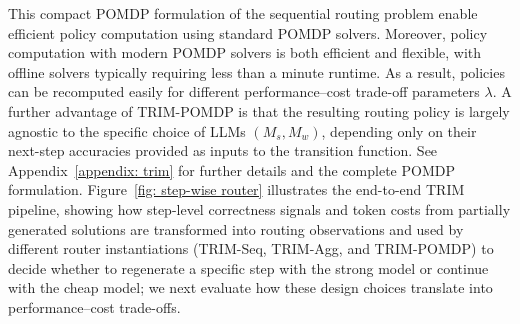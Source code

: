 \documentclass{article}
\theoremstyle{plain}
\theoremstyle{definition}
\theoremstyle{remark}
\begin{document}
This compact POMDP formulation of the sequential routing problem enable efficient policy computation using standard POMDP solvers. Moreover, policy computation with modern POMDP solvers is both efficient and flexible, with offline solvers typically requiring less than a minute runtime. As a result, policies can be recomputed easily for different performance–cost trade-off parameters $\lambda$. A further advantage of TRIM-POMDP is that the resulting routing policy is largely agnostic to the specific choice of LLMs $(M_s, M_w)$, depending only on their next-step accuracies provided as inputs to the transition function. See Appendix~\ref{appendix: trim} for further details and the complete POMDP formulation. Figure~\ref{fig: step-wise router} illustrates the end-to-end TRIM pipeline, showing how step-level correctness signals and token costs from partially generated solutions are transformed into routing observations and used by different router instantiations (TRIM-Seq, TRIM-Agg, and TRIM-POMDP) to decide whether to regenerate a specific step with the strong model or continue with the cheap model; we next evaluate how these design choices translate into performance–cost trade-offs.
\vspace{-0.2cm}
\end{document}
